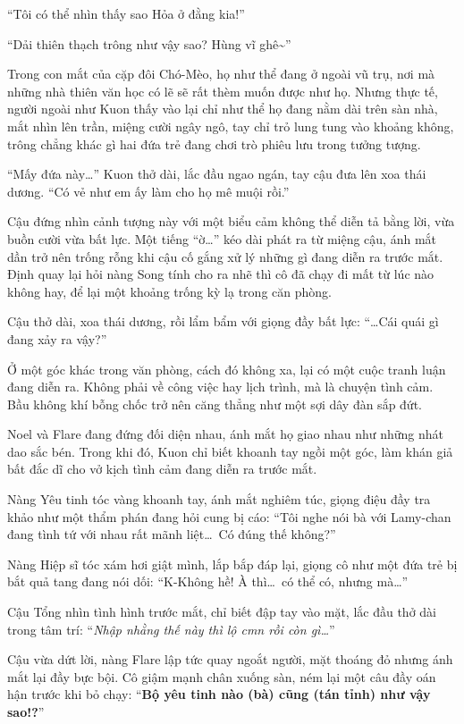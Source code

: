 \documentclass[../main.tex]{subfiles}
\begin{document}
``Tôi có thể nhìn thấy sao Hỏa ở đằng kia!''

``Dải thiên thạch trông như vậy sao? Hùng vĩ ghê\~{}''

Trong con mắt của cặp đôi Chó-Mèo, họ như thể đang ở ngoài vũ trụ, nơi mà những nhà thiên văn học có lẽ sẽ rất thèm muốn được như họ. Nhưng thực tế, người ngoài như Kuon thấy vào lại chỉ như thể họ đang nằm dài trên sàn nhà, mắt nhìn lên trần, miệng cười ngây ngô, tay chỉ trỏ lung tung vào khoảng không, trông chẳng khác gì hai đứa trẻ đang chơi trò phiêu lưu trong tưởng tượng.

``Mấy đứa này\dots'' Kuon thở dài, lắc đầu ngao ngán, tay cậu đưa lên xoa thái dương. ``Có vẻ như em ấy làm cho họ mê muội rồi.''

Cậu đứng nhìn cảnh tượng này với một biểu cảm không thể diễn tả bằng lời, vừa buồn cười vừa bất lực. Một tiếng ``ờ\dots'' kéo dài phát ra từ miệng cậu, ánh mắt dần trở nên trống rỗng khi cậu cố gắng xử lý những gì đang diễn ra trước mắt. Định quay lại hỏi nàng Song tính cho ra nhẽ thì cô đã chạy đi mất từ lúc nào không hay, để lại một khoảng trống kỳ lạ trong căn phòng.

Cậu thở dài, xoa thái dương, rồi lẩm bẩm với giọng đầy bất lực: ``\dots Cái quái gì đang xảy ra vậy?''

\ct

Ở một góc khác trong văn phòng, cách đó không xa, lại có một cuộc tranh luận đang diễn ra. Không phải về công việc hay lịch trình, mà là chuyện tình cảm. Bầu không khí bỗng chốc trở nên căng thẳng như một sợi dây đàn sắp đứt.

Noel và Flare đang đứng đối diện nhau, ánh mắt họ giao nhau như những nhát dao sắc bén. Trong khi đó, Kuon chỉ biết khoanh tay ngồi một góc, làm khán giả bất đắc dĩ cho vở kịch tình cảm đang diễn ra trước mắt.

Nàng Yêu tinh tóc vàng khoanh tay, ánh mắt nghiêm túc, giọng điệu đầy tra khảo như một thẩm phán đang hỏi cung bị cáo: ``Tôi nghe nói bà với Lamy-chan đang tình tứ với nhau rất mãnh liệt\dots\ Có đúng thế không?''

Nàng Hiệp sĩ tóc xám hơi giật mình, lắp bắp đáp lại, giọng cô như một đứa trẻ bị bắt quả tang đang nói dối: ``K-Không hề! À thì\dots\ có thể có, nhưng mà\dots''

Cậu Tổng nhìn tình hình trước mắt, chỉ biết đập tay vào mặt, lắc đầu thở dài trong tâm trí: ``\textit{Nhập nhằng thế này thì lộ cmn rồi còn gì\dots}''

Cậu vừa dứt lời, nàng Flare lập tức quay ngoắt người, mặt thoáng đỏ nhưng ánh mắt lại đầy bực bội. Cô giậm mạnh chân xuống sàn, ném lại một câu đầy oán hận trước khi bỏ chạy: ``\textbf{Bộ yêu tinh nào (bà) cũng (tán tỉnh) như vậy sao!?}''
\end{document}
